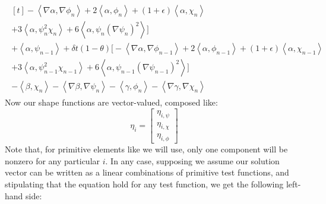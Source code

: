 \documentclass[reqno]{article}
\begin{document}
\begin{equation}
\begin{split}
\begin{multlined}[t]
                -\left<\nabla\alpha, \nabla \phi_n \right> 
                + 2 \left< \alpha, \phi_n \right>  
                + \left(1 + \epsilon\right) \left< \alpha, \chi_n \right> \\
                + 3 \left< \alpha, \psi_n^2 \chi_n \right>
                + 6 \left< \alpha, \psi_n \left(\nabla \psi_n \right)^2 \right>
                \bigr] \\
            + \left< \alpha, \psi_{n - 1} \right>
            + \delta t \left(1 - \theta \right) \bigl[
                -\left<\nabla \alpha, \nabla \phi_{n - 1} \right>
                + 2 \left< \alpha, \phi_{n - 1} \right> 
                + \left(1 + \epsilon\right) \left<\alpha, \chi_{n - 1} \right> \\
                + 3 \left< \alpha, \psi_{n - 1}^2 \chi_{n - 1} \right> 
                + 6 \left< \alpha, \psi_{n - 1} \left(\nabla \psi_{n - 1}\right)^2 \right>
            \bigr] \\
            - \left<\beta, \chi_n \right>
            - \left<\nabla\beta, \nabla \psi_n\right>
            - \left< \gamma, \phi_n \right>
            - \left< \nabla\gamma, \nabla \chi_n \right>
        \end{multlined}
    \end{split}
\end{equation}
Now our shape functions are vector-valued, composed like:
\begin{equation}
    \eta_i
    =
    \begin{bmatrix}
        \eta_{i, \psi} \\
        \eta_{i, \chi} \\
        \eta_{i, \phi}
    \end{bmatrix}
\end{equation}
Note that, for primitive elements like we will use, only one component will be nonzero for any particular $i$.
In any case, supposing we assume our solution vector can be written as a linear combinations of primitive test functions, and stipulating that the equation hold for any test function, we get the following left-hand side:
\end{document}
